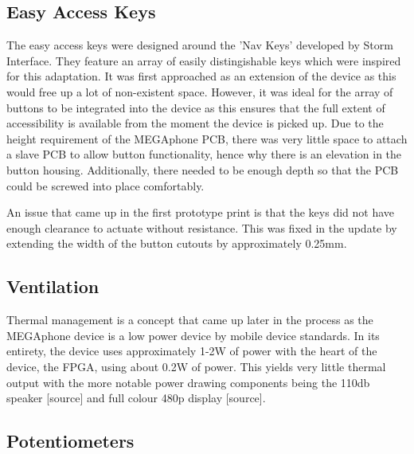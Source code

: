 \subsection{Easy Access Keys}

The easy access keys were designed around the 'Nav Keys' developed by Storm Interface. %
They feature an array of easily distingishable keys which were inspired for this adaptation. 
It was first approached as an extension of the device as this would free up a lot of non-existent space.
However, it was ideal for the array of buttons to be integrated into the device as this ensures that the full extent of accessibility is available from the moment the device is picked up.
Due to the height requirement of the MEGAphone PCB, there was very little space to attach a slave PCB to allow button functionality, hence why there is an elevation in the button housing.
Additionally, there needed to be enough depth so that the PCB could be screwed into place comfortably.

An issue that came up in the first prototype print is that the keys did not have enough clearance to actuate without resistance.
This was fixed in the update by extending the width of the button cutouts by approximately 0.25mm. %


\subsection{Ventilation}

Thermal management is a concept that came up later in the process as the MEGAphone device is a low power device by mobile device standards.
In its entirety, the device uses approximately 1-2W of power with the heart of the device, the FPGA, using about 0.2W of power.
This yields very little thermal output with the more notable power drawing components being the 110db speaker [source] and full colour 480p display [source].

\subsection{Potentiometers}

